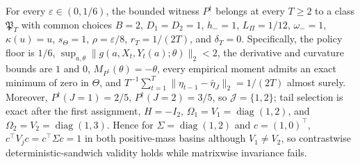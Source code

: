 For every \(\varepsilon\in(0,1/6)\), the bounded witness \(P^{\dagger}\) belongs at every \(T\ge2\) to a class \(\mathfrak P_T\) with common choices \(B=2\), \(D_1=D_2=1\), \(h_-=1\), \(L_\Pi=1/12\), \(\omega_-=1\), \(\kappa(u)=u\), \(s_\Theta=1\), \(\rho=\varepsilon/8\), \(r_T=1/(2T)\), and \(\delta_T=0\). Specifically, the policy floor is \(1/6\), \(\sup_{a,\theta}\|g(a,X_t,Y_t(a);\theta)\|_2<2\), the derivative and curvature bounds are \(1\) and \(0\), \(M_{P^{\dagger}}(\theta)=-\theta\), every empirical moment admits an exact minimum of zero in \(\Theta\), and \(T^{-1}\sum_{t=1}^T\|\eta_{t-1}-\bar\eta_J\|_2=1/(2T)\) almost surely. Moreover, \(P^{\dagger}(J=1)=2/5\), \(P^{\dagger}(J=2)=3/5\), so \(\mathcal J=\{1,2\}\); tail selection is exact after the first assignment, \(H=-I_2\), \(\Omega_1=V_1=\operatorname{diag}(1,2)\), and \(\Omega_2=V_2=\operatorname{diag}(1,3)\). Hence for \(\Sigma=\operatorname{diag}(1,2)\) and \(c=(1,0)^\top\), \(c^\top V_jc=c^\top\Sigma c=1\) in both positive-mass basins although \(V_1\ne V_2\), so contrastwise deterministic-sandwich validity holds while matrixwise invariance fails.